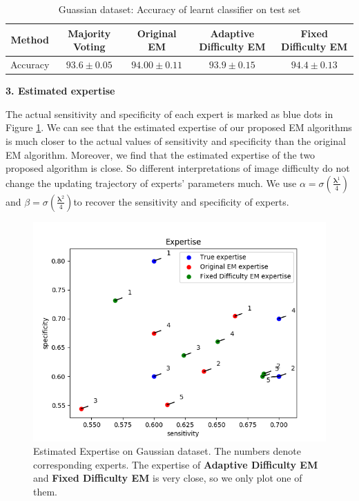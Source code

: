 \begin{table}[H]
\caption{Guassian dataset: Accuracy of learnt classifier on test set}
\label{table:gt}
\begin{center}
\begin{tabular}{c c c c c }
		\toprule
		Method & Majority Voting & Original EM & Adaptive Difficulty EM & Fixed Difficulty EM	 \\
		\midrule
        Accuracy & $93.6 \pm 0.05$  & $94.00 \pm 0.11$ & $93.9 \pm 0.15$ & $\bm{94.4 \pm 0.13}$ \\
		\bottomrule
\end{tabular}
\end{center}
\end{table}

\textbf{3. Estimated expertise}

The actual sensitivity and specificity of each expert is marked as blue dots in Figure \ref{fig:ge}. We can see that the estimated expertise of our proposed EM algorithms is much closer to the actual values of sensitivity and specificity than the original EM algorithm. Moreover, we find that the estimated expertise of the two proposed algorithm is close. So different interpretations of image difficulty do not change the updating trajectory of experts' parameters much. We use $\alpha = \sigma (\frac{\bm{\lambda}^{1}}{4})$ and $\beta = \sigma(\frac{\bm{\lambda}^{2}}{4})$to recover the sensitivity and specificity of experts.

\begin{figure}[H]
    \centering
    \includegraphics[width=5in]{image/expertise_g.png}
    \caption{Estimated Expertise on Gaussian dataset. The numbers denote corresponding experts. The expertise of \textbf{Adaptive Difficulty EM} and \textbf{Fixed Difficulty EM} is very close, so we only plot one of them. } 
    \label{fig:ge}
\end{figure}


